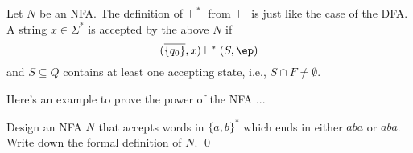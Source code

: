 \newpage
\begin{defn}
  Let $N$ be an NFA.
  The definition of $\vdash^*$ from $\vdash$ is just like the case of the
  DFA.
  A string $x \in \Sigma^*$ is accepted by the above $N$ if
  \[
  (\overline{\{q_0\}}, x) \vdash^* (S, \ep)
  \]
  and $S \subseteq Q$ contains at least one accepting state, i.e.,
  $S \cap F \neq \emptyset$.
\end{defn}



Here's an example to prove the power of the NFA ...


\newpage
\begin{ex}
Design an NFA $N$ that accepts words in $\{a, b\}^*$ which ends in 
either $aba$ or $aba$.
Write down the formal definition of $N$. 
\qed
\end{ex}
